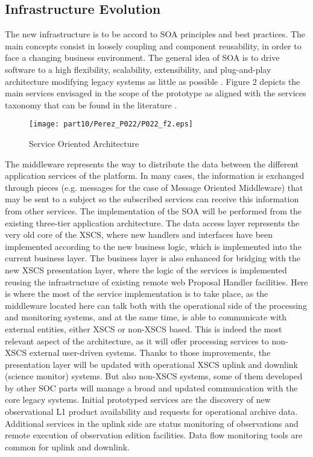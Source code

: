 \subsection{Infrastructure Evolution}
The new infrastructure is to be accord to SOA principles and best practices. The main concepts consist in loosely coupling and component reusability, in order to face a changing business environment. The general idea of SOA is to drive software to a high flexibility, scalability, extensibility, and plug-and-play architecture modifying legacy systems as little as possible \citep{soa1}. Figure 2 depicts the main services envisaged in the scope of the prototype as aligned with the services taxonomy that can be found in the literature \citep{soa2}.
\begin{figure}[ht]
\centering
\texttt{[image: part10/Perez\_P022/P022\_f2.eps]}
\caption{Service Oriented Architecture}
\end{figure}
The middleware represents the way to distribute the data between the different application services of the platform. In many cases, the information is exchanged through pieces (e.g. messages for the case of Message Oriented Middleware) that may be sent to a subject so the subscribed services can receive this information from other services. The implementation of the SOA will be performed from the existing three-tier application architecture. The data access layer represents the very old core of the XSCS, where new handlers and interfaces have been implemented according to the new business logic, which is implemented into the current business layer. The business layer is also enhanced for bridging with the new XSCS presentation layer, where the logic of the services is implemented reusing the infrastructure of existing remote web Proposal Handler facilities. Here is where the most of the service implementation is to take place, as the middleware located here can talk both with the operational side of the processing and monitoring systems, and at the same time, is able to communicate with external entities, either XSCS or non-XSCS based. This is indeed the most relevant aspect of the architecture, as it will offer processing services to non-XSCS external user-driven systems. Thanks to those improvements, the presentation layer will be updated with operational XSCS uplink and downlink (science monitor) systems. But also non-XSCS systems, some of them developed by other SOC parts will manage a broad and updated communication with the core legacy systems. Initial prototyped services are the discovery of new observational L1 product availability and requests for operational archive data. Additional services in the uplink side are status monitoring of observations and remote execution of observation edition facilities. Data flow monitoring tools are common for uplink and downlink. 

